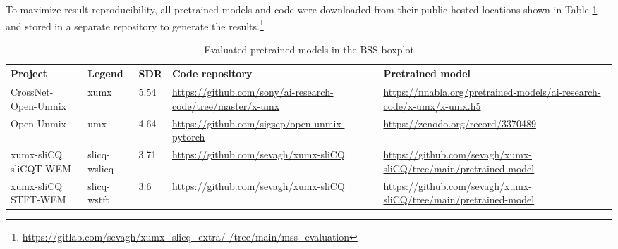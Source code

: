 \documentclass[report.tex]{subfiles}
\begin{document}
To maximize result reproducibility, all pretrained models and code were downloaded from their public hosted locations shown in Table \ref{table:bsseval} and stored in a separate repository to generate the results.\footnote{\url{https://gitlab.com/sevagh/xumx_slicq_extra/-/tree/main/mss_evaluation}}

\begin{table}[ht]
	\centering
	\caption{Evaluated pretrained models in the BSS boxplot}
	\label{table:bsseval}
	\begin{tabular}{ |p{2.5cm}|l|l|p{3.5cm}|p{3.5cm}| }
	 \hline
		Project & Legend & SDR & Code repository & Pretrained model \\
	 \hline
	 \hline
		CrossNet-Open-Unmix & xumx & 5.54 & \url{https://github.com/sony/ai-research-code/tree/master/x-umx} & \url{https://nnabla.org/pretrained-models/ai-research-code/x-umx/x-umx.h5} \\
	 \hline
		Open-Unmix & umx & 4.64 & \url{https://github.com/sigsep/open-unmix-pytorch} & \url{https://zenodo.org/record/3370489} \\
	 \hline
		\makecell[l]{xumx-sliCQ \\ sliCQT-WEM} & slicq-wslicq & 3.71 & \url{https://github.com/sevagh/xumx-sliCQ} & \url{https://github.com/sevagh/xumx-sliCQ/tree/main/pretrained-model} \\
	 \hline
		\makecell[l]{xumx-sliCQ \\ STFT-WEM} & slicq-wstft & 3.6 & \url{https://github.com/sevagh/xumx-sliCQ} & \url{https://github.com/sevagh/xumx-sliCQ/tree/main/pretrained-model} \\
	 \hline
\end{tabular}
\end{table}
\end{document}
